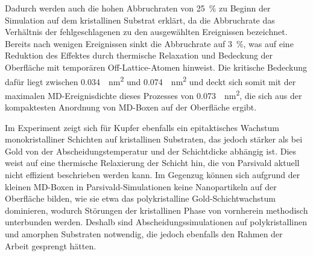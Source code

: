 Dadurch werden auch die hohen Abbruchraten von \SI{25}{\percent} zu Beginn der Simulation auf dem kristallinen Substrat erklärt, da die Abbruchrate das Verhältnis der fehlgeschlagenen zu den ausgewählten Ereignissen bezeichnet.
Bereits nach wenigen Ereignissen sinkt die Abbruchrate auf \SI{3}{\percent}, was auf eine Reduktion des Effektes durch thermische Relaxation und Bedeckung der Oberfläche mit temporären Off-Lattice-Atomen hinweist.
Die kritische Bedeckung dafür liegt zwischen \SI{0.034}{\per\nano\meter\squared} und \SI{0.074}{\per\nano\meter\squared} und deckt sich somit mit der maximalen MD-Ereignisdichte dieses Prozesses von \SI{0.073}{\per\nano\meter\squared}, die sich aus der kompaktesten Anordnung von MD-Boxen auf der Oberfläche ergibt.

Im Experiment zeigt sich für Kupfer ebenfalls ein epitaktisches Wachstum monokristalliner Schichten auf kristallinen Substraten, das jedoch stärker als bei Gold von der Abscheidungstemperatur und der Schichtdicke abhängig ist\cite{gottsche_uber_1956}.
Dies weist auf eine thermische Relaxierung der Schicht hin, die von Parsivald aktuell nicht effizient beschrieben werden kann.
Im Gegenzug können sich aufgrund der kleinen MD-Boxen in Parsivald-Simulationen keine Nanopartikeln auf der Oberfläche bilden, wie sie etwa das polykristalline Gold-Schichtwachstum dominieren, wodurch Störungen der kristallinen Phase von vornherein methodisch unterbunden werden.
Deshalb sind Abscheidungssimulationen auf polykristallinen und amorphen Substraten notwendig, die jedoch ebenfalls den Rahmen der Arbeit gesprengt hätten.

